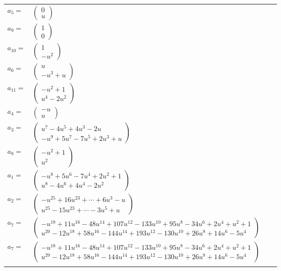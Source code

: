\documentclass[1p]{elsarticle_modified}
\theoremstyle{definition}
\begin{document}
\begin{tabular}{m{7pt} m{180pt} m{7pt} m{180pt} }
\flushright $a_{5}=$&$\begin{pmatrix}0\\u\end{pmatrix}$ \\
\flushright $a_{9}=$&$\begin{pmatrix}1\\0\end{pmatrix}$ \\
\flushright $a_{10}=$&$\begin{pmatrix}1\\- u^2\end{pmatrix}$ \\
\flushright $a_{6}=$&$\begin{pmatrix}u\\- u^3+u\end{pmatrix}$ \\
\flushright $a_{11}=$&$\begin{pmatrix}- u^2+1\\u^4-2 u^2\end{pmatrix}$ \\
\flushright $a_{4}=$&$\begin{pmatrix}- u\\u\end{pmatrix}$ \\
\flushright $a_{3}=$&$\begin{pmatrix}u^7-4 u^5+4 u^3-2 u\\- u^9+5 u^7-7 u^5+2 u^3+u\end{pmatrix}$ \\
\flushright $a_{8}=$&$\begin{pmatrix}- u^2+1\\u^2\end{pmatrix}$ \\
\flushright $a_{1}=$&$\begin{pmatrix}- u^8+5 u^6-7 u^4+2 u^2+1\\u^8-4 u^6+4 u^4-2 u^2\end{pmatrix}$ \\
\flushright $a_{2}=$&$\begin{pmatrix}- u^{25}+16 u^{23}+\cdots+6 u^3- u\\u^{25}-15 u^{23}+\cdots-3 u^5+u\end{pmatrix}$ \\
\flushright $a_{7}=$&$\begin{pmatrix}- u^{18}+11 u^{16}-48 u^{14}+107 u^{12}-133 u^{10}+95 u^8-34 u^6+2 u^4+u^2+1\\u^{20}-12 u^{18}+58 u^{16}-144 u^{14}+193 u^{12}-130 u^{10}+26 u^8+14 u^6-5 u^4\end{pmatrix}$\\ \flushright $a_{7}=$&$\begin{pmatrix}- u^{18}+11 u^{16}-48 u^{14}+107 u^{12}-133 u^{10}+95 u^8-34 u^6+2 u^4+u^2+1\\u^{20}-12 u^{18}+58 u^{16}-144 u^{14}+193 u^{12}-130 u^{10}+26 u^8+14 u^6-5 u^4\end{pmatrix}$\\&\end{tabular}
\end{document}
